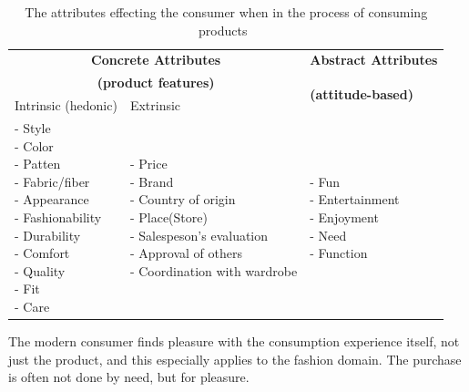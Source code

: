 \begin{table}[H]
    \centering
    \begin{tabular}{l|l|l}
      \multicolumn{2}{c|}{\textbf{Concrete Attributes}} & \textbf{Abstract Attributes} \\
      \multicolumn{2}{c|}{\textbf{(product features)}} & \multirow{2}{*}{\textbf{(attitude-based)}} \\ \cline{1-2}
      Intrinsic (hedonic)   & Extrinsic & \\ \hline
      \pbox{4cm}{
          - Style \\
          - Color \\
          - Patten \\
          - Fabric/fiber \\
          - Appearance \\
          - Fashionability \\
          - Durability \\
          - Comfort \\
          - Quality \\
          - Fit \\
          - Care \\
      } & \pbox{6cm}{
          - Price \\
          - Brand \\
          - Country of origin \\
          - Place(Store) \\
          - Salespeson's evaluation \\
          - Approval of others \\
          - Coordination with wardrobe \\
      } & \pbox{4cm}{
          - Fun \\
          - Entertainment \\
          - Enjoyment \\
          - Need \\
          - Function \\
        } \\ \hline
    \end{tabular}
    \caption[Consumers' Purchase Decisions]{The attributes effecting the consumer when in the process of consuming products~\cite{dutton2006}}
    \label{table:ConsumersPurchaseDec}
\end{table}

The modern consumer finds pleasure with the consumption experience itself, not
just the product, and this especially applies to the fashion domain.  The
purchase is often not done by need, but for pleasure.

